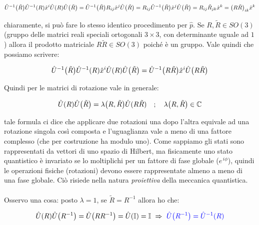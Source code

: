 \begin{align*}
	\hat{U}^{-1}\qty(\tilde{R})\hat{U}^{-1}\qty(R)\hat{x}^i\hat{U}\qty(R)\hat{U}\qty(\tilde{R}) = \hat{U}^{-1}\qty(\tilde{R}) R_{ij} \hat{x}^{j}\hat{U}\qty(\tilde{R}) = R_{ij} \hat{U}^{-1}\qty(\tilde{R})  \hat{x}^{j}\hat{U}\qty(\tilde{R}) = R_{ij}\tilde{R}_{jk}\hat{x}^{k} = \qty(R\tilde{R})_{ik} \hat{x}^k
\end{align*}

	chiaramente, si può fare lo stesso identico procedimento per $\hat{p}$. Se $R, \tilde{R} \in SO(3)$ (gruppo delle matrici reali speciali ortogonali $ 3 \times 3$, con determinante uguale ad $1$) allora il prodotto matriciale $R\tilde{R} \in SO(3)$ poiché è un gruppo. Vale quindi che possiamo scrivere:
	
\begin{align*}
	\hat{U}^{-1}\qty(\tilde{R})\hat{U}^{-1}\qty(R)\hat{x}^i\hat{U}\qty(R)\hat{U}\qty(\tilde{R}) = \hat{U}^{-1}\qty(R\tilde{R})\hat{x}^i\hat{U}\qty(R\tilde{R})
\end{align*}

	Quindi per le matrici di rotazione vale in generale:
	
\begin{nb}
\begin{align*}
	\hat{U}\qty(R)\hat{U}\qty(\tilde{R}) = \lambda\qty(R, \tilde{R}) \hat{U}(R\tilde{R}) \quad ; \quad \lambda\qty(R, \tilde{R}) \in \mathbb{C}
\end{align*}
\end{nb}

	tale formula ci dice che applicare due rotazioni una dopo l'altra equivale ad una rotazione singola così composta e l'uguaglianza vale a meno di una fattore complesso (che per costruzione ha modulo uno). Come sappiamo gli stati sono rappresentati da vettori di uno spazio di Hilbert, ma fisicamente uno stato quantistico è invariato se lo moltiplichi per un fattore di fase globale ($e^{\, i\phi}$), quindi le operazioni fisiche (rotazioni) devono essere rappresentate almeno a meno di una fase globale. Ciò risiede nella natura \textit{proiettiva} della meccanica quantistica. 
	\\
	\\
	Osservo una cosa: posto $\lambda = 1$, se $\tilde{R} = R^{-1}$ allora ho che:

\begin{align*}
	\hat{U}\qty(R)\hat{U}\qty(R^{-1}) = \hat{U}\qty(RR^{-1}) = \hat{U}\qty(\mathbb{I}) = \mathbb{I} \, \, \Rightarrow \, \, \textcolor{blue}{\hat{U}\qty(R^{-1}) = \hat{U}^{-1}\qty(R)}
\end{align*}

